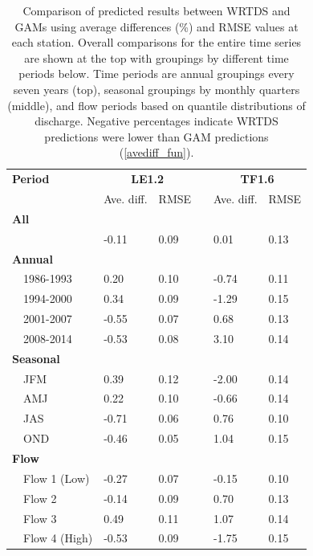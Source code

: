 \documentclass[letterpaper,12pt,oneside]{article}\usepackage[]{graphicx}\usepackage[]{color}
\begin{document}
\begin{table}[!tbp]
\caption{Comparison of predicted results between \ac{WRTDS} and \acp{GAM} using average differences (\%) and \ac{RMSE} values at each station.  Overall comparisons for the entire time series are shown at the top with groupings by different time periods below.  Time periods are annual groupings every seven years (top), seasonal groupings by monthly quarters (middle), and flow periods based on quantile distributions of discharge. Negative percentages indicate \ac{WRTDS} predictions were lower than \ac{GAM} predictions (\cref{avediff_fun}).\label{tab:perfbtw}} 
\begin{center}
\begin{tabular}{lllcll}
\hline\hline
\multicolumn{1}{l}{\bfseries Period}&\multicolumn{2}{c}{\bfseries LE1.2}&\multicolumn{1}{c}{\bfseries }&\multicolumn{2}{c}{\bfseries TF1.6}\tabularnewline
\cline{2-3} \cline{5-6}
\multicolumn{1}{l}{}&\multicolumn{1}{c}{Ave. diff.}&\multicolumn{1}{c}{\ac{RMSE}}&\multicolumn{1}{c}{}&\multicolumn{1}{c}{Ave. diff.}&\multicolumn{1}{c}{\ac{RMSE}}\tabularnewline
\hline
{\bfseries All}&&&&&\tabularnewline
~~&-0.11&0.09&& 0.01&0.13\tabularnewline
\hline
{\bfseries Annual}&&&&&\tabularnewline
~~1986-1993& 0.20&0.10&&-0.74&0.11\tabularnewline
~~1994-2000& 0.34&0.09&&-1.29&0.15\tabularnewline
~~2001-2007&-0.55&0.07&& 0.68&0.13\tabularnewline
~~2008-2014&-0.53&0.08&& 3.10&0.14\tabularnewline
\hline
{\bfseries Seasonal}&&&&&\tabularnewline
~~JFM& 0.39&0.12&&-2.00&0.14\tabularnewline
~~AMJ& 0.22&0.10&&-0.66&0.14\tabularnewline
~~JAS&-0.71&0.06&& 0.76&0.10\tabularnewline
~~OND&-0.46&0.05&& 1.04&0.15\tabularnewline
\hline
{\bfseries Flow}&&&&&\tabularnewline
~~Flow 1 (Low)&-0.27&0.07&&-0.15&0.10\tabularnewline
~~Flow 2&-0.14&0.09&& 0.70&0.13\tabularnewline
~~Flow 3& 0.49&0.11&& 1.07&0.14\tabularnewline
~~Flow 4 (High)&-0.53&0.09&&-1.75&0.15\tabularnewline
\hline
\end{tabular}\end{center}

\end{table}
\end{document}
